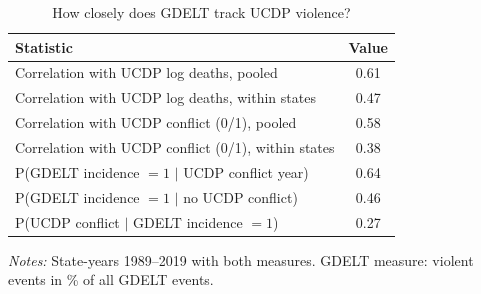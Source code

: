 \begin{table}[htbp]
\centering
\small
\caption{How closely does GDELT track UCDP violence?}
\label{tab:gdeltvalidation}
\begin{threeparttable}
\begin{tabular}{lc}
\toprule
Statistic & Value \\
\midrule
Correlation with UCDP log deaths, pooled & 0.61 \\
Correlation with UCDP log deaths, within states & 0.47 \\
Correlation with UCDP conflict (0/1), pooled & 0.58 \\
Correlation with UCDP conflict (0/1), within states & 0.38 \\
P(GDELT incidence $=1$ $|$ UCDP conflict year) & 0.64 \\
P(GDELT incidence $=1$ $|$ no UCDP conflict) & 0.46 \\
P(UCDP conflict $|$ GDELT incidence $=1$) & 0.27 \\
\bottomrule
\end{tabular}
\begin{tablenotes}[flushleft]\footnotesize
\item \textit{Notes:} State-years 1989--2019 with both measures. GDELT measure: violent events in \% of all GDELT events.
\end{tablenotes}
\end{threeparttable}
\end{table}
